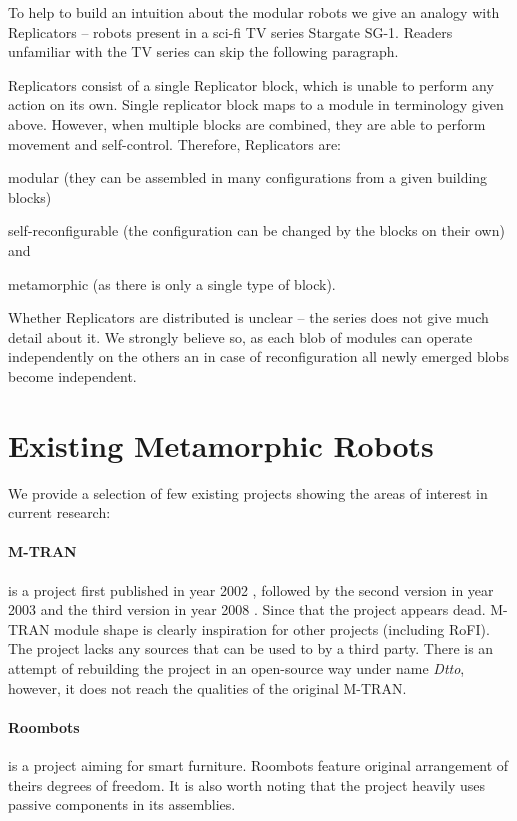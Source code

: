 To help to build an intuition about the modular robots we give an analogy with
Replicators -- robots present in a sci-fi TV series Stargate
SG-1\cite{wright_stargate_1997}. Readers unfamiliar with the TV series can skip
the following paragraph.

Replicators consist of a single Replicator block, which is unable to perform any
action on its own. Single replicator block maps to a module in terminology given
above. However, when multiple blocks are combined, they are able to perform
movement and self-control. Therefore, Replicators are:
\begin{enumerate*}
    \item modular (they can be assembled in many configurations from a given
    building blocks)
    \item self-reconfigurable (the configuration can be changed by the blocks on
    their own) and
    \item metamorphic (as there is only a single type of block).
\end{enumerate*}
Whether Replicators are distributed is unclear -- the series does not give much
detail about it. We strongly believe so, as each blob of modules can operate
independently on the others an in case of reconfiguration all newly emerged
blobs become independent.

\section{Existing Metamorphic Robots}

We provide a selection of few existing projects showing the areas of interest in
current research:

\paragraph{M-TRAN} is a project first published in year 2002
\cite{murata_m-tran:_2002}, followed by the second version in year 2003
\cite{haruhisa_kurokawa_m-tran_2003} and the third version in year 2008
\cite{kurokawa_distributed_2008}. Since that the project appears dead. M-TRAN
module shape is clearly inspiration for other projects (including RoFI). The
project lacks any sources that can be used to by a third party. There is an
attempt of rebuilding the project in an open-source way under name
\emph{Dtto}\cite{noauthor_dtto_nodate}, however, it does not reach the qualities
of the original M-TRAN.

\paragraph{Roombots} \cite{bonardi_locomotion_2012} is a project aiming for
smart furniture. Roombots feature original arrangement of theirs degrees of
freedom. It is also worth noting that the project heavily uses passive
components in its assemblies.

